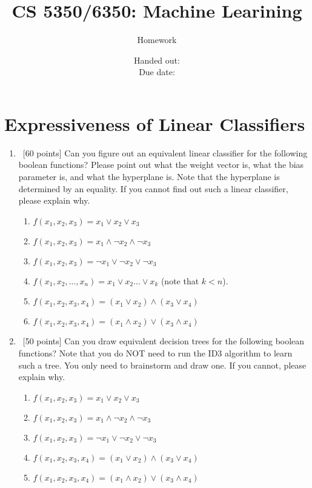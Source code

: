 \documentclass[12pt, fullpage,letterpaper]{article}
\title{CS 5350/6350: Machine Learining \semester}
\author{Homework \assignmentId}
\date{Handed out: \releaseDate\\
  Due date: \dueDate}
\begin{document}
\maketitle





\section{Expressiveness of Linear Classifiers}
\begin{enumerate}
\item~[60 points] Can you figure out an equivalent linear classifier for the following boolean functions? Please point out what the weight vector is, what the bias parameter is, and what the hyperplane is. Note that the hyperplane is determined by an equality. If you cannot find out such a  linear classifier, please explain why. 
\begin{enumerate}
\item $f(x_1, x_2, x_3) = x_1 \lor x_2 \lor x_3$
\item $f(x_1, x_2, x_3) = x_1 \land \neg x_2 \land \neg x_3$
\item $f(x_1, x_2, x_3) = \neg x_1 \lor \neg x_2 \lor \neg x_3$ 
\item $f(x_1, x_2, \ldots, x_n) = x_1 \lor x_2 \ldots \lor x_k$ (note that  $k <n$). 
\item $f(x_1, x_2, x_3, x_4) = (x_1 \lor x_2) \land (x_3 \lor x_4)$
\item $f(x_1, x_2, x_3, x_4) = (x_1 \land x_2) \lor (x_3 \land x_4)$
\end{enumerate}

\item~[50 points] Can you draw  equivalent decision trees for the following boolean functions? Note that you do NOT need to run the ID3 algorithm to learn such a tree. You only need to brainstorm and draw one. If you cannot, please explain why. 
\begin{enumerate}
\item $f(x_1, x_2, x_3) = x_1 \lor x_2 \lor x_3$
\item $f(x_1, x_2, x_3) = x_1 \land \neg x_2 \land \neg x_3$
\item $f(x_1, x_2, x_3) = \neg x_1 \lor \neg x_2 \lor \neg x_3$ 
\item $f(x_1, x_2, x_3, x_4) = (x_1 \lor x_2) \land (x_3 \lor x_4)$
\item $f(x_1, x_2, x_3, x_4) = (x_1 \land x_2) \lor (x_3 \land x_4)$
\end{enumerate}


\end{enumerate}
\end{document}

